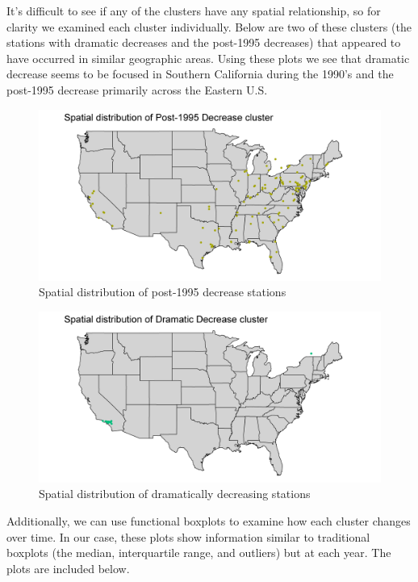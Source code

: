 \documentclass[11pt, oneside]{article}
\theoremstyle{definition}
\begin{document}
It's difficult to see if any of the clusters have any spatial relationship, so for clarity we examined each cluster individually. Below are two of these clusters (the stations with dramatic decreases and the post-1995 decreases) that appeared to have occurred in similar geographic areas. Using these plots we see that dramatic decrease seems to be focused in Southern California during the 1990's and the post-1995 decrease primarily across the Eastern U.S.

\begin{figure}[H]
    \centering
    \includegraphics[width=0.9\linewidth]{plots/clustering/spatial_cluster_2.png}
    \caption{Spatial distribution of post-1995 decrease stations}
    \label{spatial_2}
\end{figure}

\begin{figure}[H]
    \centering
    \includegraphics[width=0.9\linewidth]{plots/clustering/spatial_cluster_3.png}
    \caption{Spatial distribution of dramatically decreasing stations}
    \label{spatial_3}
\end{figure}

Additionally, we can use functional boxplots to examine how each cluster changes over time. In our case, these plots show information similar to traditional boxplots (the median, interquartile range, and outliers) but at each year. The plots are included below.
\end{document}
